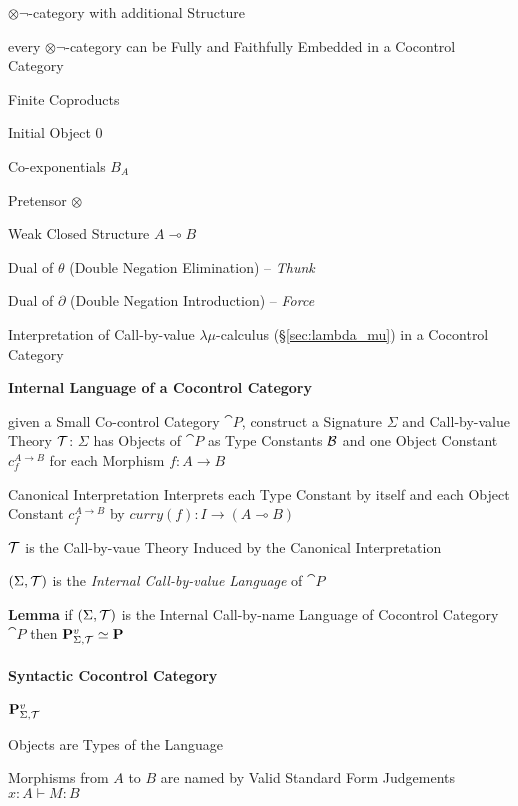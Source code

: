 $\otimes\neg$-category with additional Structure %

every $\otimes\neg$-category can be Fully and Faithfully Embedded in a
Cocontrol Category

Finite Coproducts

Initial Object $0$

Co-exponentials $B_A$

Pretensor $\otimes$

Weak Closed Structure $A \multimap B$


Dual of $\theta$ (Double Negation Elimination) -- \emph{Thunk}

Dual of $\partial$ (Double Negation Introduction) -- \emph{Force}


\asterism


Interpretation of Call-by-value $\lambda\mu$-calculus
(\S\ref{sec:lambda_mu}) in a Cocontrol Category


\textbf{Internal Language of a Cocontrol Category}

given a Small Co-control Category $\cat{P}$, construct a Signature
$\Sigma$ and Call-by-value Theory $\mathcal{T}$: $\Sigma$ has Objects of
$\cat{P}$ as Type Constants $\mathcal{B}$ and one Object Constant
$c_f^{A \rightarrow B}$ for each Morphism $f : A \rightarrow B$

Canonical Interpretation Interprets each Type Constant by itself and
each Object Constant $c_f^{A \rightarrow B}$ by $curry(f): I
\rightarrow (A \multimap B)$

$\mathcal{T}$ is the Call-by-vaue Theory Induced by the Canonical
Interpretation

$(\Sigma,\mathcal{T})$ is the \emph{Internal Call-by-value Language} of
$\cat{P}$

\textbf{Lemma} if $(\Sigma,\mathcal{T})$ is the Internal Call-by-name
Language of Cocontrol Category $\cat{P}$ then
$\mathbf{P}^v_{\Sigma,\mathcal{T}} \simeq \mathbf{P}$


\paragraph{Syntactic Cocontrol Category}
\label{sec:syntactic_cocontrol_category}\hfill

$\mathbf{P}^v_{\Sigma,\mathcal{T}}$

Objects are Types of the Language

Morphisms from $A$ to $B$ are named by Valid Standard Form Judgements
$x:A \vdash M:B$

